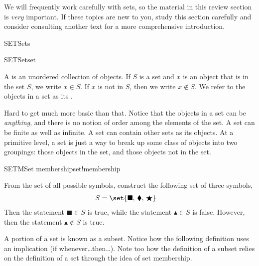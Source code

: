 %
\begin{introduction}
\begin{para}We will frequently work carefully with sets, so the material in this review section is {\em very} important.  If these topics are new to you, study this section carefully and consider consulting another text for a more comprehensive introduction.\end{para}
\end{introduction}
%
\begin{subsect}{SET}{Sets}
%
\begin{definition}{SET}{Set}{set}
\begin{para}A  is an unordered collection of objects.  If $S$ is a set and $x$ is an object that is in the set $S$, we write $x\in S$.  If $x$ is not in $S$, then we write $x\not\in S$.  We refer to the objects in a set as its .\end{para}
\end{definition}
%
\begin{para}Hard to get much more basic than that.   Notice that the objects in a set can be {\em anything}, and there is no notion of order among the elements of the set.  A set can be finite as well as infinite.  A set can contain other sets as its objects.  At a primitive level, a set is just a way to break up some class of objects into two groupings:  those objects in the set, and those objects not in the set.\end{para}
%
\begin{example}{SETM}{Set membership}{set!membership}
\begin{para}From the set of all possible symbols, construct the following set of three symbols,
%
\begin{align*}
S&=\set{\blacksquare,\,\blacklozenge,\,\bigstar}
\end{align*}
%
Then the statement $\blacksquare\in S$ is true, while the statement $\blacktriangle\in S$ is false.  However, then the statement $\blacktriangle\not\in S$ is true.\end{para}
\end{example}
%
\begin{para}A portion of a set is known as a subset.  Notice how the following definition uses an implication (if whenever\dots then\dots).  Note too how the definition of a subset relies on the definition of a set through the idea of set membership.\end{para}

\end{subsect}
